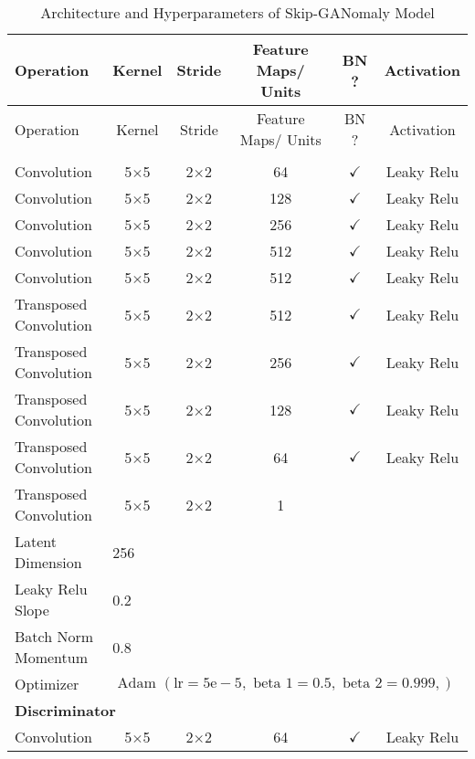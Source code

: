 \footnotesize
\begin{longtable}[c]{@{}lccccc@{}}
	\caption{Architecture and Hyperparameters of Skip-GANomaly Model}
	\label{tab:sganomaly_imp}\\
	\toprule
	Operation & Kernel & Stride & Feature Maps/ Units & BN ? & Activation \\* \midrule
	\endfirsthead
	\toprule
	Operation & Kernel & Stride & Feature Maps/ Units & BN ? & Activation \\* \midrule
	\endhead
	\bottomrule
	\endfoot
	\endlastfoot
	\multicolumn{6}{l}{\textbf{Generator}} \\
	Convolution & \multicolumn{1}{c}{5$\times$5} & 2$\times$2 & 64 & $\checkmark$ & Leaky Relu \\
	Convolution & \multicolumn{1}{c}{5$\times$5} & 2$\times$2 & 128 & $\checkmark$ & Leaky Relu \\
	Convolution & \multicolumn{1}{c}{5$\times$5} & 2$\times$2 & 256 & $\checkmark$ & Leaky Relu \\
	Convolution & \multicolumn{1}{c}{5$\times$5} & 2$\times$2 & 512 & $\checkmark$ & Leaky Relu \\
	Convolution & \multicolumn{1}{c}{5$\times$5} & 2$\times$2 & 512 & $\checkmark$ & Leaky Relu \\
	Transposed Convolution & \multicolumn{1}{c}{5$\times$5} & 2$\times$2 & 512 & $\checkmark$ & Leaky Relu \\
	Transposed Convolution & \multicolumn{1}{c}{5$\times$5} & 2$\times$2 & 256 & $\checkmark$ & Leaky Relu \\
	Transposed Convolution & \multicolumn{1}{c}{5$\times$5} & 2$\times$2 & 128 & $\checkmark$ & Leaky Relu \\
	Transposed Convolution & \multicolumn{1}{c}{5$\times$5} & 2$\times$2 & 64 & $\checkmark$ & Leaky Relu \\
	Transposed Convolution & \multicolumn{1}{c}{5$\times$5} & 2$\times$2 & 1 &  &  \\
	Latent Dimension & \multicolumn{5}{l}{256} \\
	Leaky Relu Slope & \multicolumn{5}{l}{0.2} \\
	Batch Norm Momentum & \multicolumn{5}{l}{0.8} \\
	Optimizer & \multicolumn{5}{l}{$\text { Adam }(\mathrm{lr}=5 \mathrm{e}-5, \text { beta } 1=0.5, \text { beta } 2=0.999,)$} \\ \hline
	\multicolumn{6}{l}{\textbf{Discriminator}} \\
	Convolution & \multicolumn{1}{c}{5$\times$5} & 2$\times$2 & 64 & $\checkmark$ & Leaky Relu \\

\end{longtable}
